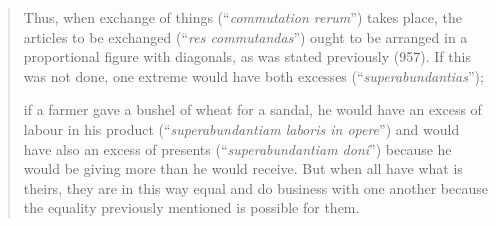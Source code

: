     \begin{quote}
        Thus, when exchange of things (``\textit{commutation rerum}'') takes place, the articles to be exchanged (``\textit{res commutandas}'') ought to be arranged in a proportional figure with diagonals, as was stated previously (957). If this was not done, one extreme would have both excesses (``\textit{superabundantias}'');

        if a farmer gave a bushel of wheat for a sandal, he would have an excess of labour in his product (``\textit{superabundantiam laboris in opere}'') and would have also an excess of presents (``\textit{superabundantiam doni}'') because he would be giving more than he would receive. But when all have what is theirs, they are in this way equal and do business with one another because the equality previously mentioned is possible for them.
    \end{quote}

            